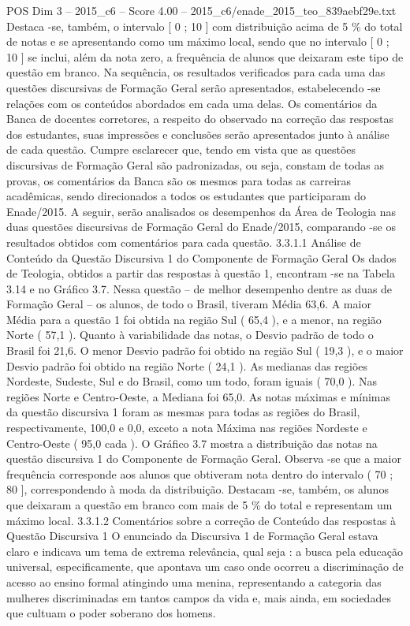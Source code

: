\begin{textsample}{POS Dim 3 – 2015\_c6 – Score 4.00 – 2015\_c6/enade\_2015\_teo\_839aebf29e.txt}
Destaca -se, também, o intervalo [ 0 ; 10 ] com distribuição acima de 5 \% do total de notas e se apresentando como um máximo local, sendo que no intervalo [ 0 ; 10 ] se inclui, além da nota zero, a frequência de alunos que deixaram este tipo de questão em branco.
Na sequência, os resultados verificados para cada uma das questões discursivas de Formação Geral serão apresentados, estabelecendo -se relações com os conteúdos abordados em cada uma delas.
Os comentários da Banca de docentes corretores, a respeito do observado na correção das respostas dos estudantes, suas impressões e conclusões serão apresentados junto à análise de cada questão.
Cumpre esclarecer que, tendo em vista que as questões discursivas de Formação Geral são padronizadas, ou seja, constam de todas as provas, os comentários da Banca são os mesmos para todas as carreiras acadêmicas, sendo direcionados a todos os estudantes que participaram do Enade/2015.
A seguir, serão analisados os desempenhos da Área de Teologia nas duas questões discursivas de Formação Geral do Enade/2015, comparando -se os resultados obtidos com comentários para cada questão. 3.3.1.1 Análise de Conteúdo da Questão Discursiva 1 do Componente de Formação Geral Os dados de Teologia, obtidos a partir das respostas à questão 1, encontram -se na Tabela 3.14 e no Gráfico 3.7.
Nessa questão – de melhor desempenho dentre as duas de Formação Geral – os alunos, de todo o Brasil, tiveram Média 63,6.
A maior Média para a questão 1 foi obtida na região Sul ( 65,4 ), e a menor, na região Norte ( 57,1 ).
Quanto à variabilidade das notas, o Desvio padrão de todo o Brasil foi 21,6.
O menor Desvio padrão foi obtido na região Sul ( 19,3 ), e o maior Desvio padrão foi obtido na região Norte ( 24,1 ).
As medianas das regiões Nordeste, Sudeste, Sul e do Brasil, como um todo, foram iguais ( 70,0 ).
Nas regiões Norte e Centro-Oeste, a Mediana foi 65,0.
As notas máximas e mínimas da questão discursiva 1 foram as mesmas para todas as regiões do Brasil, respectivamente, 100,0 e 0,0, exceto a nota Máxima nas regiões Nordeste e Centro-Oeste ( 95,0 cada ).
O Gráfico 3.7 mostra a distribuição das notas na questão discursiva 1 do Componente de Formação Geral.
Observa -se que a maior frequência corresponde aos alunos que obtiveram nota dentro do intervalo ( 70 ; 80 ], correspondendo à moda da distribuição.
Destacam -se, também, os alunos que deixaram a questão em branco com mais de 5 \% do total e representam um máximo local. 3.3.1.2 Comentários sobre a correção de Conteúdo das respostas à Questão Discursiva 1 O enunciado da Discursiva 1 de Formação Geral estava claro e indicava um tema de extrema relevância, qual seja : a busca pela educação universal, especificamente, que apontava um caso onde ocorreu a discriminação de acesso ao ensino formal atingindo uma menina, representando a categoria das mulheres discriminadas em tantos campos da vida e, mais ainda, em sociedades que cultuam o poder soberano dos homens.

\end{textsample}
